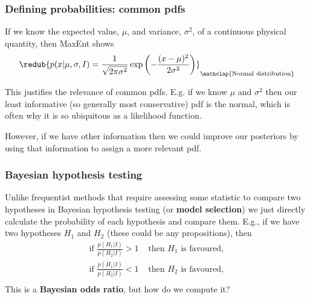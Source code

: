 \begin{frame}

\frametitle{Defining probabilities: common pdfs}
\label{definingprobabilities:commonpdfs}

If we know the expected value, $\mu$, and variance, $\sigma^2$, of a continuous physical quantity, then MaxEnt shows
\[
\redub{p(x|\mu,\sigma,I) = \frac{1}{\sqrt{2\pi\sigma^2}}\exp{\left(-\frac{(x-\mu)^2}{2\sigma^2} \right)}}_{\mathclap{\text{Normal distribution}}}
\]

This justifies the relevance of common pdfs. E.g. if we know $\mu$ and $\sigma^2$ then our least informative
(so generally most conservative) pdf is the normal, which is often why it is so ubiquitous as a likelihood function. 

However, if we have other information then we could improve our posteriors by using that information to
assign a more relevant pdf.

\end{frame}

\begin{frame}

\frametitle{Bayesian hypothesis testing}
\label{bayesianhypothesistesting}

Unlike frequentist methods that require assessing some statistic to compare two hypotheses in
Bayesian hypothesis testing (or \textbf{model selection}) we just directly calculate the probability
of each hypothesis and compare them. E.g., if we have two hypotheses $H_1$ and $H_2$ (these could
be any propositions), then
\begin{align*}
\text{if } \frac{p(H_1|I)}{p(H_2|I)} > 1 & \text{ then } H_1 \text{ is favoured}, \\
\text{if } \frac{p(H_1|I)}{p(H_2|I)} < 1 & \text{ then } H_2 \text{ is favoured}, \\
\end{align*}
This is a \textbf{Bayesian odds ratio}, but how do we compute it?

\end{frame}


